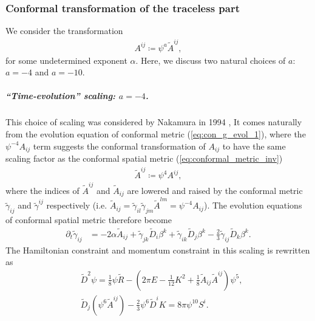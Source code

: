 \subsubsection{Conformal transformation of the traceless part}
\label{section1.3.2.2}
We consider the transformation
\begin{align}
    A^{ij} \coloneqq \psi^a \tilde{A}^{ij},
\end{align}
for some undetermined exponent $\alpha$.
Here, we discuss two natural choices of $a$: $a = -4$ and $a = -10$.

\subparagraph{“Time-evolution” scaling: $a=-4$.}
This choice of scaling was considered by Nakamura in 1994 \cite{nakamura19943d},
It comes naturally from the evolution equation of conformal metric (\ref{eq:con_g_evol_1}),
where the $\psi^{-4}A_{ij}$ term suggests the conformal transformation of $A_{ij}$ to have the same scaling factor as the conformal spatial metric (\ref{eq:conformal_metric_inv})
\begin{align}
    \tilde{A}^{ij} \coloneqq \psi^4 A^{ij},
\end{align}
where the indices of $\tilde{A}^{ij}$ and $\tilde{A}_{ij}$ are lowered and raised by the conformal metric $\tilde{\gamma}_{ij}$ and $\tilde{\gamma}^{ij}$ respectively
(i.e. $\tilde{A}_{ij} = \tilde{\gamma}_{il}\tilde{\gamma}_{jm}\tilde{A}^{lm} = \psi^{-4} A_{ij}$).
The evolution equations of conformal spatial metric therefore become
\begin{align}
    \partial_t \tilde{\gamma}_{ij} &= - 2\alpha \tilde{A}_{ij} + \tilde{\gamma}_{jk} \tilde{D}_i \beta^k + \tilde{\gamma}_{ik} \tilde{D}_j \beta^k - \frac{2}{3} \tilde{\gamma}_{ij} \tilde{D}_k \beta^k.
\end{align}
The Hamiltonian constraint and momentum constraint in this scaling is rewritten as
\begin{align}
    &\tilde{D}^2 \psi = \frac{1}{8} \psi \tilde{R} - \left( 2 \pi E - \frac{1}{12}K^2 + \frac{1}{8} \tilde{A}_{ij} \tilde{A}^{ij} \right) \psi^5, 
    \label{eq:H_const_s4}\\
    &\tilde{D}_j \left(\psi^6 \tilde{A}^{ij} \right) - \frac{2}{3}\psi^6 \tilde{D}^i K = 8\pi \psi^{10} S^i.\label{eq:S_const_s4}
\end{align}

